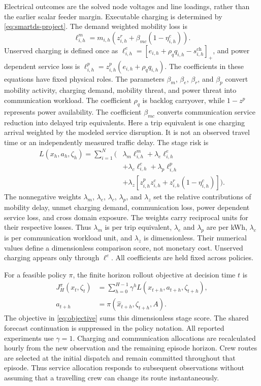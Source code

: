 \documentclass[journal]{IEEEtran}
\begin{document}
Electrical outcomes are the solved node voltages and line loadings, rather than
the earlier scalar feeder margin.  Executable charging is determined by
\eqref{eq:smartds-project}.
The demand weighted mobility loss is
\begin{equation}
\ell_{i,h}^{m}=
m_{i,h}\left(z_{i,h}^{r}+\beta_{mc}(1-\eta_{i,h}^{c})\right).
\end{equation}
Unserved charging is defined once as
$\ell_{i,h}^{e}=[e_{i,h}+\rho_q q_{i,h}-s_{i,h}^{\mathrm{ch}}]_+$, and
power dependent service loss is
$\ell_{i,h}^{p}=z_{i,h}^{p}(e_{i,h}+\rho_q q_{i,h})$.
The coefficients in these equations have fixed physical roles.  The parameters
$\beta_m$, $\beta_e$, $\beta_r$, and $\beta_p$ convert mobility activity,
charging demand, mobility threat, and power threat into communication workload.
The coefficient $\rho_q$ is backlog carryover, while $1-z^p$ represents power
availability.  The coefficient $\beta_{mc}$ converts
communication service reduction into delayed trip equivalents.
Here a trip equivalent is one charging arrival weighted by the modeled service
disruption.  It is not an observed travel time or an independently measured
traffic delay.
The stage risk is
\begin{align}
L(x_h,a_h,\zeta_h)
=\sum_{i=1}^{N}\big(&
\lambda_m\ell_{i,h}^{m}+\lambda_e\ell_{i,h}^{e} \nonumber\\
&+\lambda_c\ell_{i,h}^{c}
+\lambda_p\ell_{i,h}^{p} \nonumber\\
&+\lambda_z[z_{i,h}^{p}z_{i,h}^{c}
+z_{i,h}^{r}(1-\eta_{i,h}^{c})]\big).
\label{eq:stage}
\end{align}
The nonnegative weights $\lambda_m$, $\lambda_e$, $\lambda_c$, $\lambda_p$, and
$\lambda_z$ set the relative contributions of mobility delay, unmet charging
demand, communication loss, power dependent service loss, and cross domain
exposure.  The weights carry reciprocal units for their respective losses.
Thus $\lambda_m$ is per trip equivalent, $\lambda_e$ and $\lambda_p$ are per kWh,
$\lambda_c$ is per communication workload unit, and $\lambda_z$ is dimensionless.
Their numerical values define a dimensionless comparison score, not monetary cost.
Unserved charging appears only through $\ell^e$.  All coefficients are held
fixed across policies.

For a feasible policy $\pi$, the finite horizon rollout objective at decision
time $t$ is
\begin{align}
J_H^{\pi}(x_t,\zeta_t)
&=\sum_{h=0}^{H-1}\gamma^h L(x_{t+h},a_{t+h},\zeta_{t+h}), \label{eq:objective}\\
a_{t+h}
&=\pi(\hat x_{t+h},\zeta_{t+h},A).
\end{align}
The objective in \eqref{eq:objective} sums this dimensionless stage score.
The shared forecast continuation is suppressed in the policy notation.
All reported experiments use $\gamma=1$.  Charging and communication allocations
are recalculated hourly from the new observation and the remaining episode
horizon.  Crew routes are selected at the initial dispatch and remain committed
throughout that episode.  Thus service allocation responds to subsequent
observations without assuming that a travelling crew can change its route
instantaneously.
\end{document}
